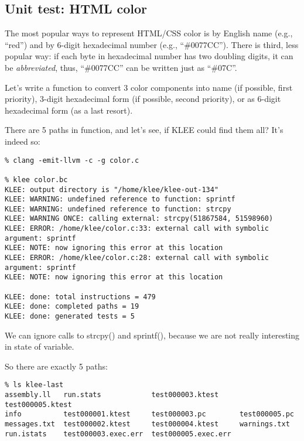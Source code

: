 \subsection{Unit test: HTML color}

The most popular ways to represent HTML/CSS color is by English name (e.g., ``red'') and by 6-digit hexadecimal number (e.g., ``\#0077CC'').
There is third, less popular way: if each byte in hexadecimal number has two doubling digits, it can be \textit{abbreviated}, thus, 
``\#0077CC'' can be written just as ``\#07C''.

Let's write a function to convert 3 color components into name (if possible, first priority), 3-digit hexadecimal form (if possible, second priority),
or as 6-digit hexadecimal form (as a last resort).



There are 5 paths in function, and let's see, if KLEE could find them all?
It's indeed so:

\begin{lstlisting}
% clang -emit-llvm -c -g color.c

% klee color.bc
KLEE: output directory is "/home/klee/klee-out-134"
KLEE: WARNING: undefined reference to function: sprintf
KLEE: WARNING: undefined reference to function: strcpy
KLEE: WARNING ONCE: calling external: strcpy(51867584, 51598960)
KLEE: ERROR: /home/klee/color.c:33: external call with symbolic argument: sprintf
KLEE: NOTE: now ignoring this error at this location
KLEE: ERROR: /home/klee/color.c:28: external call with symbolic argument: sprintf
KLEE: NOTE: now ignoring this error at this location

KLEE: done: total instructions = 479
KLEE: done: completed paths = 19
KLEE: done: generated tests = 5
\end{lstlisting}

We can ignore calls to strcpy() and sprintf(), because we are not really interesting in state of  variable.

So there are exactly 5 paths:

\begin{lstlisting}
% ls klee-last
assembly.ll   run.stats            test000003.ktest     test000005.ktest
info          test000001.ktest     test000003.pc        test000005.pc
messages.txt  test000002.ktest     test000004.ktest     warnings.txt
run.istats    test000003.exec.err  test000005.exec.err
\end{lstlisting}

